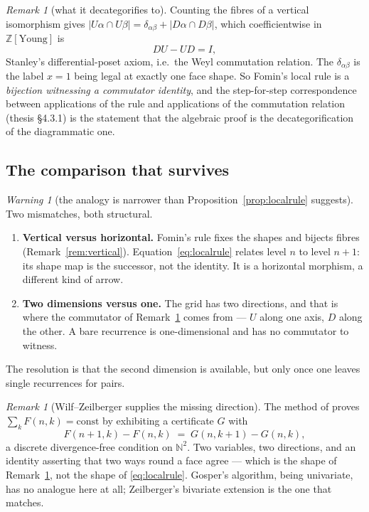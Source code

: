 \documentclass[11pt,a4paper]{article}
\theoremstyle{definition}
\theoremstyle{remark}
\newtheorem{remark}[theorem]{Remark}
\newtheorem{warning}[theorem]{Warning}
\newcommand{\NN}{\mathbb{N}}
\newcommand{\ZZ}{\mathbb{Z}}
\newcommand{\norm}[1]{\lvert #1 \rvert}
\begin{document}
\begin{remark}[what it decategorifies to]\label{rem:weyl}
Counting the fibres of a vertical isomorphism gives
$\norm{U\alpha \cap U\beta} = \delta_{\alpha\beta} + \norm{D\alpha\cap D\beta}$, which
coefficientwise in $\ZZ[\text{Young}]$ is
\[
  DU - UD = I,
\]
Stanley's differential-poset axiom, i.e.\ the Weyl commutation relation. The
$\delta_{\alpha\beta}$ is the label $x=1$ being legal at exactly one face shape. So
Fomin's local rule is a \emph{bijection witnessing a commutator identity}, and the
step-for-step correspondence between applications of the rule and applications of the
commutation relation (thesis \S4.3.1) is the statement that the algebraic proof is the
decategorification of the diagrammatic one.
\end{remark}

\subsection{The comparison that survives}

\begin{warning}[the analogy is narrower than Proposition~\ref{prop:localrule} suggests]\label{warn:analogy}
Two mismatches, both structural.
\begin{enumerate}[nosep,label=(\roman*)]
  \item \textbf{Vertical versus horizontal.} Fomin's rule fixes the shapes and
        bijects fibres (Remark~\ref{rem:vertical}). Equation~\eqref{eq:localrule}
        relates level $n$ to level $n+1$: its shape map is the successor, not the
        identity. It is a horizontal morphism, a different kind of arrow.
  \item \textbf{Two dimensions versus one.} The grid has two directions, and that is
        where the commutator of Remark~\ref{rem:weyl} comes from --- $U$ along one
        axis, $D$ along the other. A bare recurrence is one-dimensional and has no
        commutator to witness.
\end{enumerate}
\end{warning}

The resolution is that the second dimension is available, but only once one leaves
single recurrences for pairs.

\begin{remark}[Wilf--Zeilberger supplies the missing direction]\label{rem:WZ}
The method of \cite{AeqB} proves $\sum_k F(n,k) = \text{const}$ by exhibiting a
certificate $G$ with
\[
  F(n+1,k) - F(n,k) \;=\; G(n,k+1) - G(n,k),
\]
a discrete divergence-free condition on $\NN^2$. Two variables, two directions, and an
identity asserting that two ways round a face agree --- which is the shape of
Remark~\ref{rem:weyl}, not the shape of \eqref{eq:localrule}. Gosper's algorithm,
being univariate, has no analogue here at all; Zeilberger's bivariate extension is
the one that matches.
\end{remark}
\end{document}
